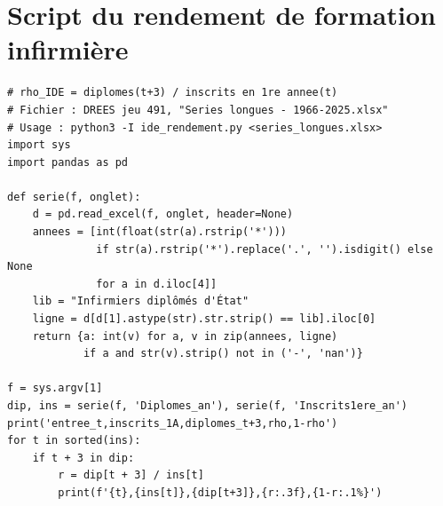 \documentclass[11pt]{article}
\begin{document}


\appendix
\section{Script du rendement de formation infirmière}\label{app:script}
\begin{verbatim}
# rho_IDE = diplomes(t+3) / inscrits en 1re annee(t)
# Fichier : DREES jeu 491, "Series longues - 1966-2025.xlsx"
# Usage : python3 -I ide_rendement.py <series_longues.xlsx>
import sys
import pandas as pd

def serie(f, onglet):
    d = pd.read_excel(f, onglet, header=None)
    annees = [int(float(str(a).rstrip('*')))
              if str(a).rstrip('*').replace('.', '').isdigit() else None
              for a in d.iloc[4]]
    lib = "Infirmiers diplômés d'État"
    ligne = d[d[1].astype(str).str.strip() == lib].iloc[0]
    return {a: int(v) for a, v in zip(annees, ligne)
            if a and str(v).strip() not in ('-', 'nan')}

f = sys.argv[1]
dip, ins = serie(f, 'Diplomes_an'), serie(f, 'Inscrits1ere_an')
print('entree_t,inscrits_1A,diplomes_t+3,rho,1-rho')
for t in sorted(ins):
    if t + 3 in dip:
        r = dip[t + 3] / ins[t]
        print(f'{t},{ins[t]},{dip[t+3]},{r:.3f},{1-r:.1%}')
\end{verbatim}
\end{document}
